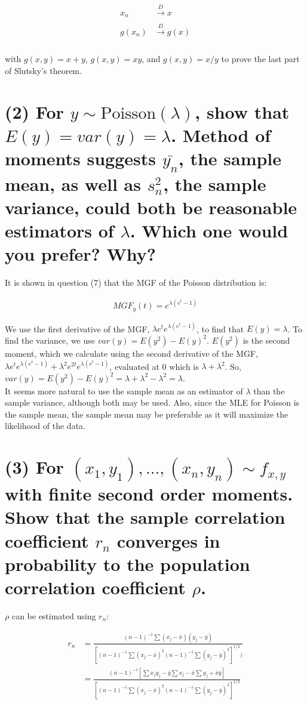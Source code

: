\documentclass[11pt]{article}
\begin{document}
\begin{align*}
    x_n & \xrightarrow[]{D} x \\ 
    g(x_n) & \xrightarrow[]{D} g(x) \\ 
\end{align*}

with $g(x,y) = x+y$,  $g(x,y) = xy$, and $g(x,y) = x/y$ to prove the last part of Slutsky's theorem.


\section*{(2) For $y \sim \text{Poisson}(\lambda)$, show that $E(y) = var(y) = \lambda$. Method of moments suggests $\bar{y_n}$, the sample mean, as well as $s^2_n$, the sample variance, could both be reasonable estimators of $\lambda$. Which one would you prefer? Why?}

It is shown in question (7) that the MGF of the Poisson distribution is:

\begin{align*}
    MGF_y(t) = e^{\lambda(e^t-1)}
\end{align*}

We use the first derivative of the MGF, $\lambda e^{t}e^{\lambda(e^t-1)}$, to find that $E(y) = \lambda$. To find the variance, we use $var(y) = E(y^2)-E(y)^2$. $ E(y^2)$ is the second moment, which we calculate using the second derivative of the MGF,  $\lambda e^t e^{\lambda(e^t-1)}+\lambda^2e^{2t}e^{\lambda(e^t-1)}$, evaluated at 0 which is $\lambda + \lambda^2$. So, $var(y) = E(y^2)-E(y)^2 =\lambda + \lambda^2 - \lambda^2=\lambda$.\\

It seems more natural to use the sample mean as an estimator of $\lambda$ than the sample variance, although both may be used. Also, since the MLE for Poisson is the sample mean, the sample mean may be preferable as it will maximize the likelihood of the data.

\section*{(3) For $(x_1, y_1), ... , (x_n, y_n) \sim f_{x,y}$ with finite second order moments. Show that the sample correlation coefficient $r_n$ converges in probability to the population correlation coefficient $\rho$.}


$\rho$ can be estimated using $r_n$:

\begin{align*}
    r_n &= \frac{(n-1)^{-1}\sum (x_j-\bar{x})(y_j-\bar{y})}{[(n-1)^{-1}\sum (x_j-\bar{x})^2 (n-1)^{-1}\sum (y_j-\bar{y})^2]^{1/2}) }\\
    &=\frac{(n-1)^{-1}[\sum x_j y_j - \bar{y}\sum x_j - \bar{x}\sum y_j + \bar{x}\bar{y}]}{[(n-1)^{-1}\sum (x_j-\bar{x})^2 (n-1)^{-1}\sum (y_j-\bar{y})^2]^{1/2}}
\end{align*}
\end{document}

